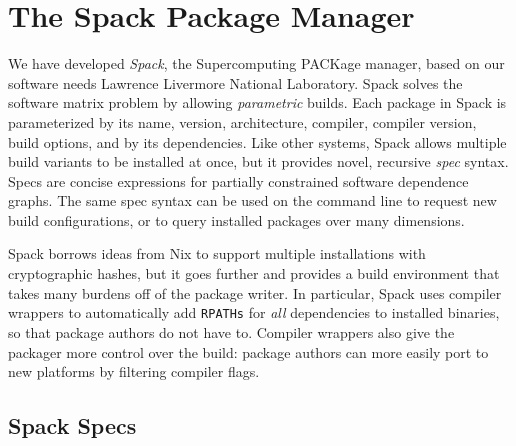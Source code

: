 

\section{The Spack Package Manager}
\label{sec:implementation}

We have developed {\it Spack}, the Supercomputing PACKage manager, based on our
software needs Lawrence Livermore National Laboratory.
Spack solves the software matrix problem by allowing {\it parametric} builds.
Each package in Spack is parameterized by its name, version, architecture, compiler, 
compiler version, build options, and by its dependencies.
Like other systems, Spack allows multiple build variants to be installed at once,
but it provides novel, recursive {\it spec} syntax.  Specs are concise
expressions for partially constrained software dependence graphs. The same
spec syntax can be used on the command line to request new build 
configurations, or to query installed packages over many dimensions.

Spack borrows ideas from Nix to support multiple installations with 
cryptographic hashes, but it goes further and provides a build environment
that takes many burdens off of the package writer.  In particular, Spack uses
compiler wrappers to automatically add {\tt RPATHs} for {\it all} dependencies
to installed binaries, so that package authors do not have to.  Compiler
wrappers also give the packager more control over the build: package authors
can more easily port to new platforms by filtering compiler flags.

\subsection{Spack Specs}

%  
%
%  
%                  
%
%
%
%
%
%


